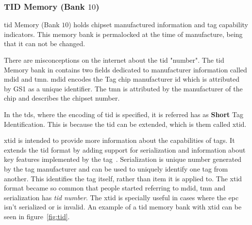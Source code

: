 \subsubsection{TID Memory (Bank $10$)}

\ac{tid} Memory (Bank $10$) holds chipset manufactured information and tag capability indicators. This memory bank is permalocked at the time of manufacture, being that it can not be changed.

There are misconceptions on the internet about the \ac{tid} "number".
The \ac{tid} Memory bank in contains two fields dedicated to manufacturer information called \ac{mdid} and \ac{tmn}.
\ac{mdid} encodes the Tag chip manufacturer \ac{id} which is attributed by GS1 as a unique identifier.
The \ac{tmn} is attributed by the manufacturer of the chip and describes the chipset number.

In the \ac{tds}, where the encoding of \ac{tid} is specified, it is referred has as \textbf{Short} Tag Identification.
This is because the \ac{tid} can be extended, which is them called \ac{xtid}.

\ac{xtid} is intended to provide more information about the capabilities of tags. It extends the \ac{tid} format by adding support for serialization and information about key features implemented by the tag~\cite{EPCTagData}.
Serialization is unique number generated by the tag manufacturer and can be used to uniquely identify one tag from another.
This identifies the tag itself, rather than item it is applied to.
The \ac{xtid} format became so common that people started referring to \ac{mdid}, \ac{tmn} and serialization has \emph{\ac{tid} number}.
The \ac{xtid} is specially useful in cases where the \ac{epc} isn’t serialized or is invalid.
An example of a \ac{tid} memory bank with \ac{xtid} can be seen in figure~\ref{fig:tid}.

